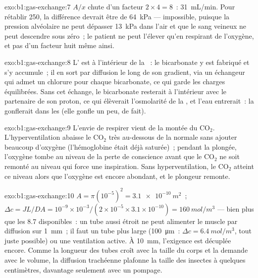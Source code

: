 \begin{solution}{exo:b1:gas-exchange:7}
$A/x$ chute d'un facteur $2\times 4 = 8$~: \qty{31}{mL/min}. Pour
rétablir \qty{250}{}, la différence devrait être de \qty{64}{kPa} ---
impossible, puisque la pression alvéolaire ne peut dépasser
\qty{13}{kPa} dans l'air et que le sang veineux ne peut descendre
sous zéro~; le patient ne peut l'élever qu'en respirant de l'oxygène,
et pas d'un facteur huit même ainsi.
\end{solution}

\begin{solution}{exo:b1:gas-exchange:8}
L' est à l'intérieur de la ~: le
bicarbonate y est fabriqué et s'y accumule~; il en sort par diffusion
le long de son gradient, via un échangeur qui admet un chlorure pour
chaque bicarbonate, ce qui garde les charges équilibrées. Sans cet
échange, le bicarbonate resterait à l'intérieur avec le partenaire de
son proton, ce qui élèverait l'osmolarité de la , et l'eau
entrerait~: la  gonflerait dans les  (elle gonfle un peu,
de fait).
\end{solution}

\begin{solution}{exo:b1:gas-exchange:9}
L'envie de respirer vient de la montée du $\mathrm{CO_2}$.
L'hyperventilation abaisse le $\mathrm{CO_2}$ très au-dessous de la
normale sans ajouter beaucoup d'oxygène (l'hémoglobine était déjà
saturée)~; pendant la plongée, l'oxygène tombe au niveau de la perte de
conscience avant que le $\mathrm{CO_2}$ ne soit remonté au niveau qui
force une inspiration. Sans hyperventilation, le $\mathrm{CO_2}$ atteint
ce niveau alors que l'oxygène est encore abondant, et le plongeur
remonte.
\end{solution}

\begin{solution}{exo:b1:gas-exchange:10}
$A = \pi(10^{-5})^2 = \qty{3.1e-10}{m^2}$~; $\Delta c = JL/DA =
10^{-9}\times 10^{-3}/(2\times 10^{-5}\times 3.1\times 10^{-10}) =
\qty{160}{mol/m^3}$ --- bien plus que les \qty{8.7}{} disponibles~: un
tube aussi étroit ne peut alimenter le muscle par diffusion sur
\qty{1}{mm}~; il faut un tube plus large (\qty{100}{\micro m}~:
$\Delta c = \qty{6.4}{mol/m^3}$, tout juste possible) ou une
ventilation active. À \qty{10}{mm}, l'exigence est décuplée encore.
Comme la longueur des tubes croît avec la taille du corps et la demande
avec le volume, la diffusion trachéenne plafonne la taille des insectes
à quelques centimètres, davantage seulement avec un pompage.
\end{solution}

